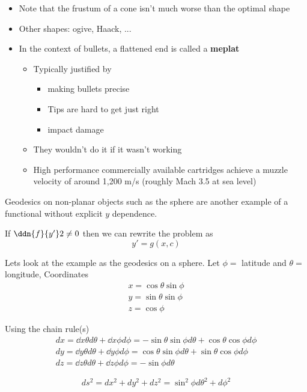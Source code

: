 \documentclass{X:/Documents/Coding/Latex/myassignment}
\begin{document}
\begin{itemize}
	\item Note that the frustum of a cone isn't much worse than the optimal shape
	\item Other shapes: ogive, Haack, ...
	\item In the context of bullets, a flattened end is called a \textbf{meplat}
	\begin{itemize}
		\item Typically justified by
		\begin{itemize}
			\item making bullets precise
			\item Tips are hard to get just right
			\item impact damage
		\end{itemize}
		\item They wouldn't do it if it wasn't working
		\item High performance commercially available cartridges achieve a muzzle velocity of around 1,200 m/s (roughly Mach 3.5 at sea level)
	\end{itemize}
\end{itemize}


Geodesics on non-planar objects such as the sphere are another example of a functional without explicit $y$ dependence.

If $\ddn{f}{y'}2 \neq 0$ then we can rewrite the problem as
\[y' = g(x,c)\]



Lets look at the example as the geodesics on a sphere. Let $\phi = $ latitude and $\theta = $ longitude,
Coordinates
\begin{align*}
	x = \cos\theta \sin\phi\\
	y = \sin\theta \sin \phi \\
	z = \cos\phi
\end{align*}

Using the chain rule(s)
\begin{align*}
	dx = \dd x \theta d\theta + \dd x \phi d\phi = -\sin\theta \sin\phi d\theta + \cos\theta \cos \phi d\phi\\
	dy = \dd y \theta d\theta + \dd y \phi d\phi =\cos\theta \sin\phi d\theta + \sin\theta \cos\phi d\phi\\
	dz = \dd z\theta d\theta + \dd z\phi d\phi = -\sin\phi d\theta
\end{align*}

\[ds^2 = dx^2 + dy^2 + dz^2 = \sin^2\phi d\theta^2 + d\phi^2\]
\end{document}
